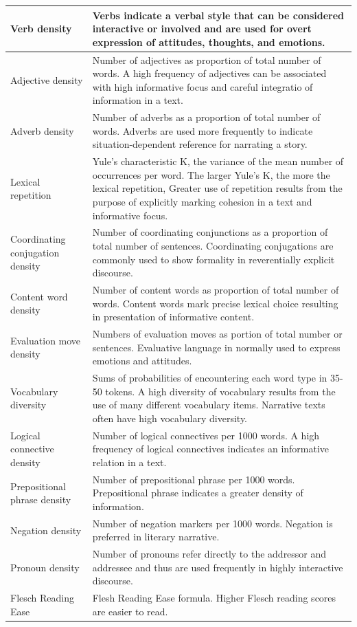 \begin{table}[t]
\begin{tabular}{p{2cm}p{12cm}}
        Verb density &  Verbs indicate a verbal style that can be considered interactive or involved and are used for overt expression of attitudes, thoughts, and emotions. \\
        \hline
        Adjective density & Number of adjectives as proportion of total number of words. A high frequency of adjectives can be associated with high informative focus and careful integratio of information in a text. \\
        \hline
        Adverb density & Number of adverbs as a proportion of total number of words. Adverbs are used more frequently to indicate situation-dependent reference for narrating a story. \\
        \hline
        Lexical repetition & Yule's characteristic K, the variance of the mean number of occurrences per word. The larger Yule's K, the more the lexical repetition, Greater use of repetition results from the purpose of explicitly marking cohesion in a text and informative focus.  \\
        \hline
        Coordinating conjugation density & Number of coordinating conjunctions as a proportion of total number of sentences. Coordinating conjugations are commonly used to show formality in reverentially explicit discourse.  \\
        \hline
        Content word density & Number of content words as proportion of total number of words. Content words mark precise lexical choice resulting in presentation of informative content.\\
        \hline
        Evaluation move density & Numbers of evaluation moves as portion of total number or sentences. Evaluative language in normally used to express emotions and attitudes.  \\
        \hline
        Vocabulary diversity & Sums of probabilities of encountering each word type in 35-50 tokens. A high diversity of vocabulary results from the use of many different vocabulary items. Narrative texts often have high vocabulary diversity.  \\
        \hline
        Logical connective density & Number of logical connectives per 1000 words. A high frequency of logical connectives indicates an informative relation in a text.  \\
        \hline
        Prepositional phrase density & Number of prepositional phrase per 1000 words. Prepositional phrase indicates a greater density of information.  \\
        \hline
        Negation density & Number of negation markers per 1000 words. Negation is preferred in literary narrative.  \\
        \hline
        Pronoun density & Number of pronouns refer directly to the addressor and addressee and thus are used frequently in highly interactive discourse. \\
        \hline
        Flesch Reading Ease & Flesh Reading Ease formula. Higher Flesch reading scores are easier to read.  \\
  		\hline
	\end{tabular}
\end{table}

